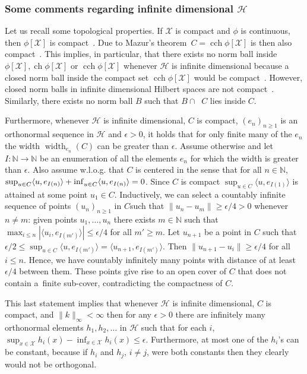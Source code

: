 \documentclass[AHL,Unicode,longabstracts,published]{cedram}
\theoremstyle{remark}
\DeclareMathOperator*{\infd}{inf\vphantom{p}}
\DeclareMathOperator{\cch}{cch}
\DeclareMathOperator{\ch}{ch}
\DeclareMathOperator{\caff}{\overline{aff}}
\DeclareMathOperator{\diame}{width}
\newcommand{\bbN}{\mathbb{N}}
\newcommand{\X}{\mathcal{X}}
\newcommand{\cH}{\mathcal{H}}
\begin{document}
\subsubsection{Some comments regarding infinite dimensional \texorpdfstring{$\cH$}{cH}} \label{sec:width_infty}
Let us recall some topological properties. If $\X$ is compact and $\phi$ is continuous, then $\phi[\X]$ is compact~\cite[Theorem~3.1.10]{ENG89}. Due to Mazur's theorem~$C = \cch \phi[\X]$ is then also compact~\cite[Theorem~12, p.~51]{DIES77}. This implies, in particular, that there exists no norm ball inside $\phi[\X], \ch \phi[\X]$ or $\cch \phi[\X]$ whenever $\cH$ is infinite dimensional because a closed norm ball inside the compact set $\cch \phi[\X]$ would be compact~\cite[Theorem~3.1.2]{ENG89}. However, closed norm balls in infinite dimensional Hilbert spaces are not compact~\cite[Section~I.2.7]{Wer02}. Similarly, there exists no norm ball $B$ such that $B \cap \caff C$ lies inside $C$.

Furthermore, whenever $\cH$ is infinite dimensional, $C$ is compact, $(e_n)_{n\geq 1}$ is an orthonormal sequence in $\cH$ and $\epsilon >0$, it holds that for only finite many of the $e_n$ the width $\diame_{e_n}(C)$ can be greater than $\epsilon$. Assume otherwise and let $I:\bbN \rightarrow \bbN$ be an enumeration of all the elements $e_n$ for which the width is greater than $\epsilon$. Also assume w.l.o.g. that $C$ is centered in the sense that for all $n \in \bbN$, $\sup_{u \in C} \langle u,e_{I(n)}\rangle + \infd_{u\in C} \langle u, e_{I(n)} \rangle = 0$. Since $C$ is compact $\sup_{u \in C} \langle u,e_{I(1)}\rangle$ is attained at some point $u_1 \in C$. Inductively, we can select a countably infinite sequence of points $(u_n)_{n\geq 1}$ in $C$\linebreak such that $\|u_n - u_m\| \geq \epsilon/4 > 0$ whenever $n\not = m$: given points $u_1,\dots, u_n$ there exists $m\in \bbN$ such that $\max_{i\leq n} |\langle u_i, e_{I(m')} \rangle | \leq \epsilon/4$ for all $m' \geq m$. Let $u_{n+1}$ be a point in $C$ such that $\epsilon/2 \leq \sup_{u \in C} \langle u,e_{I(m')}\rangle = \langle u_{n+1}, e_{I(m')} \rangle$. Then $\|u_{n+1} - u_i\| \geq \epsilon/4$ for all $i\leq n$. Hence, we have countably infinitely many points with distance of at least $\epsilon/4$ between them. These points give rise to an open cover of $C$ that does not contain a~finite sub-cover, contradicting the compactness of $C$.

This last statement implies that whenever $\cH$ is infinite dimensional, $C$ is compact, and $\|k\|_\infty < \infty$ then for any $\epsilon>0$ there are infinitely many orthonormal elements $h_1,h_2, \dots$ in $\cH$ such that for each $i$, $\sup_{x\in \X} h_i(x) - \inf_{x\in \X} h_i(x) \leq \epsilon$. Furthermore, at most one of the $h_i$'s can be constant, because if $h_i$ and $h_j$, $i\not=j$, were both constants then they clearly would not be orthogonal.
\end{document}

